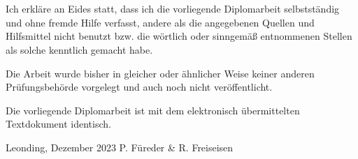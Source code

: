 \thispagestyle{empty}
\vspace{3cm}
~ \\ \\
Ich erkläre an Eides statt, dass ich die vorliegende Diplomarbeit selbstständig und ohne fremde Hilfe verfasst, andere als die angegebenen Quellen und Hilfsmittel nicht benutzt bzw. die wörtlich oder sinngemäß entnommenen Stellen als solche kenntlich gemacht habe.

Die Arbeit wurde bisher in gleicher oder ähnlicher Weise keiner anderen Prüfungsbehörde vorgelegt und auch noch nicht veröffentlicht.

Die vorliegende Diplomarbeit ist mit dem elektronisch übermittelten Textdokument identisch.
\vspace{3cm}
\begin{tabbing}
Leonding, Dezember 2023 \hspace{5cm} P. Füreder \& R. Freiseisen
\end{tabbing}
\vspace{10cm}
\newpage
\setcounter{page}{1}
